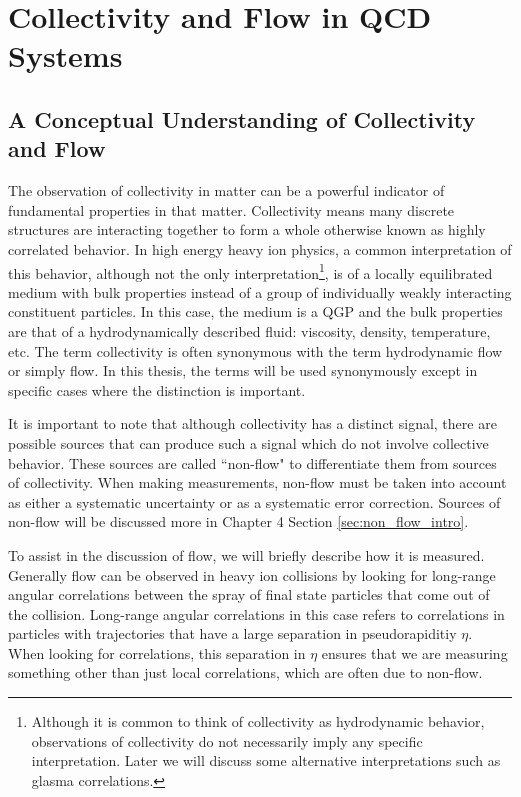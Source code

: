 \chapter{Collectivity and Flow in QCD Systems}
\section{A Conceptual Understanding of Collectivity and Flow}
The observation of collectivity in matter can be a powerful indicator of fundamental properties in that matter. Collectivity means many discrete structures are interacting together to form a whole otherwise known as highly correlated behavior. In high energy heavy ion physics, a common interpretation of this behavior, although not the only interpretation\footnote{Although it is common to think of collectivity as hydrodynamic behavior, observations of collectivity do not necessarily imply any specific interpretation. Later we will discuss some alternative interpretations such as glasma correlations.}, is of a locally equilibrated medium with bulk properties instead of a group of individually weakly interacting constituent particles. In this case, the medium is a QGP and the bulk properties are that of a hydrodynamically described fluid: viscosity, density, temperature, etc. The term collectivity is often synonymous with the term hydrodynamic flow or simply flow. In this thesis, the terms will be used synonymously except in specific cases where the distinction is important.

It is important to note that although collectivity has a distinct signal, there are possible sources that can produce such a signal which do not involve collective behavior. These sources are called ``non-flow" to differentiate them from sources of collectivity. When making measurements, non-flow must be taken into account as either a systematic uncertainty or as a systematic error correction. Sources of non-flow will be discussed more in Chapter 4 Section \ref{sec:non_flow_intro}. 

To assist in the discussion of flow, we will briefly describe how it is measured. Generally flow can be observed in heavy ion collisions by looking for long-range angular correlations between the spray of final state particles that come out of the collision. Long-range angular correlations in this case refers to correlations in particles with trajectories that have a large separation in pseudorapiditiy $\eta$. When looking for correlations, this separation in $\eta$ ensures that we are measuring something other than just local correlations, which are often due to non-flow. 

